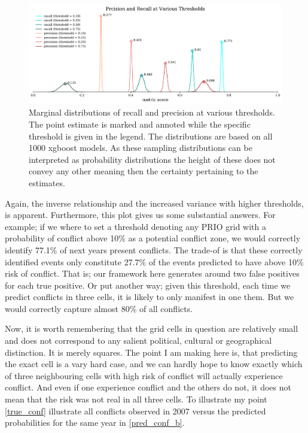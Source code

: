 \documentclass[a4paper]{article}
\begin{document}
\begin{figure}[!htb]
	\centering
	\includegraphics[scale=0.5]{threshold_plot.pdf}
    \caption{\footnotesize{Marginal distributions of recall and precision at various thresholds. The point estimate is marked and annoted while the specific threshold is given in the legend. The distributions are based on all 1000 xgboost models. As these sampling distributions can be interpreted as probability distributions the height of these does not convey any other meaning then the certainty pertaining to the estimates.}}\label{threshold_plot}
\end{figure}

Again, the inverse relationship and the increased variance with higher thresholds, is apparent. Furthermore, this plot gives us some substantial answers. For example; if we where to set a threshold denoting any PRIO grid with a probability of conflict above 10\% as a potential conflict zone, we would correctly identify 77.1\% of next years present conflicts. The trade-of is that these correctly identified events only constitute 27.7\% of the events predicted to have above 10\% risk of conflict. That is; our framework here generates around two false positives for each true positive. Or put another way; given this threshold, each time we predict conflicts in three cells, it is likely to only manifest in one them. But we would correctly capture almost 80\% of all conflicts.\par

Now, it is worth remembering that the grid cells in question are relatively small and does not correspond to any salient political, cultural or geographical distinction. It is merely squares. The point I am making here is, that predicting the exact cell is a vary hard case, and we can hardly hope to know exactly which of three neighbouring cells with high risk of conflict will actually experience conflict. And even if one experience conflict and the others do not, it does not mean that the risk was not real in all three cells. To illustrate my point \autoref{true_conf} illustrate all conflicts observed in 2007 versus the predicted probabilities for the same year in \autoref{pred_conf_b}.\par
\end{document}
